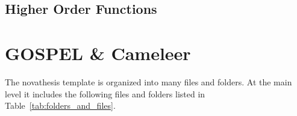 

\subsection{Higher Order Functions}
\label{sub:higher_order_functions}

\section{GOSPEL \& Cameleer}
\label{sec:gospel_and_cameleer}

The \gls{novathesis} template is organized into many files and folders. At the main level it includes the following files and folders listed in Table~\ref{tab:folders_and_files}.

\newcommand{\accessAllowed}{\texttt{[image: access\_allowed]}}
\newcommand{\accessForbiden}{\texttt{[image: dont\_touch]}}
\newcommand{\File}{\texttt{[image: file]}}
\newcommand{\Folder}{\texttt{[image: folder]}}


